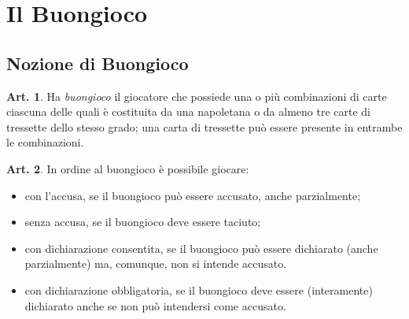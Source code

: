 \documentclass[italian,a4paper]{book}
\theoremstyle{definition}
\newtheorem{art}{Art.}
\newenvironment{packeditem}{
\begin{itemize}
  \setlength{\itemsep}{1pt}
  \setlength{\parskip}{0pt}
  \setlength{\parsep}{0pt}
}{\end{itemize}}
\begin{document}
\section{Il Buongioco}
\subsection{Nozione di Buongioco}
\begin{art}
    Ha \emph{buongioco} il giocatore che possiede una o più combinazioni di carte ciascuna delle quali è costituita da una napoletana o da almeno tre carte di tressette dello stesso grado; una carta di tressette può essere presente in entrambe le combinazioni.
\end{art}
\begin{art}
In ordine al buongioco è possibile giocare:
\begin{packeditem}
\item    con l'accusa, se il buongioco può essere accusato, anche parzialmente;
\item    senza accusa, se il buongioco deve essere taciuto;
\item    con dichiarazione consentita, se il buongioco può essere dichiarato (anche parzialmente) ma, comunque, non si intende accusato.
\item    con dichiarazione obbligatoria, se il buongioco deve essere (interamente) dichiarato anche se non può intendersi come accusato.
    \end{packeditem}
\end{art}
\end{document}
